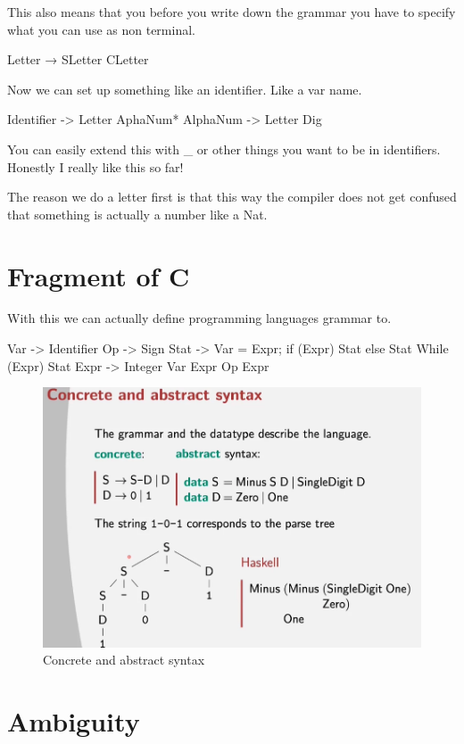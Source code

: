 \documentclass[
  11pt,
  british,
]{article}
\begin{document}
This also means that you before you write down the grammar you have to
specify what you can use as non terminal.

Letter → SLetter \textbar{} CLetter

Now we can set up something like an identifier. Like a var name.

Identifier -\textgreater{} Letter \textbar{} AphaNum* AlphaNum
-\textgreater{} Letter \textbar{} Dig

You can easily extend this with \_ or other things you want to be in
identifiers. Honestly I really like this so far!

The reason we do a letter first is that this way the compiler does not
get confused that something is actually a number like a Nat.

\hypertarget{fragment-of-c}{%
\section{Fragment of C}\label{fragment-of-c}}

With this we can actually define programming languages grammar to.

Var -\textgreater{} Identifier Op -\textgreater{} Sign Stat
-\textgreater{} Var = Expr; \textbar{} if (Expr) Stat else Stat
\textbar{} While (Expr) Stat Expr -\textgreater{} Integer \textbar{} Var
\textbar{} Expr Op Expr

\begin{figure}
\centering
\includegraphics{Pasted_image_20211127142739.png}
\caption{Concrete and abstract syntax}
\end{figure}

\hypertarget{ambiguity}{%
\section{Ambiguity}\label{ambiguity}}
\end{document}
